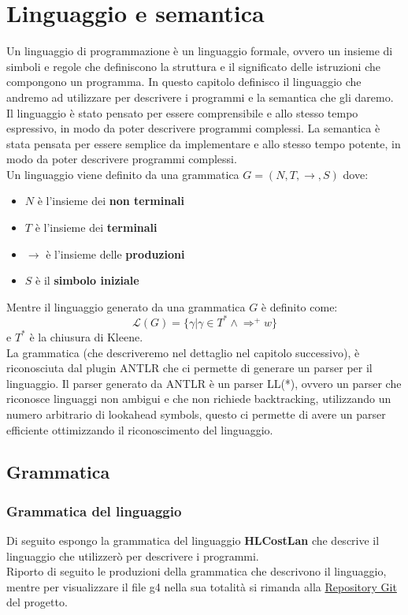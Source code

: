 \documentclass[../../main.tex]{subfiles}
\begin{document}
\chapter{Linguaggio e semantica}
Un linguaggio di programmazione è un linguaggio formale, ovvero un insieme di simboli e regole che definiscono la struttura e il significato delle istruzioni che compongono un programma.
In questo capitolo definisco il linguaggio che andremo ad utilizzare per descrivere i programmi e la semantica che gli daremo. Il linguaggio è stato pensato per essere comprensibile e allo stesso tempo espressivo, in modo da poter descrivere programmi complessi. La semantica è stata pensata per essere semplice da implementare e allo stesso tempo potente, in modo da poter descrivere programmi complessi.\\
Un linguaggio viene definito da una grammatica $G = (N, T ,\rightarrow, S)$ dove:
\begin{itemize}
    \item $N$ è l'insieme dei \textbf{non terminali}
    \item $T$ è l'insieme dei \textbf{terminali}
    \item $\rightarrow$ è l'insieme delle \textbf{produzioni}
    \item $S$ è il \textbf{simbolo iniziale}
\end{itemize}

Mentre il linguaggio generato da una grammatica $G$ è definito come:
\begin{equation}
    \mathcal{L}(G) = \{\gamma | \gamma \in T^* \land \Rightarrow^+ w\}
\end{equation}
e $T^*$ è la chiusura di Kleene.\\
La grammatica (che descriveremo nel dettaglio nel capitolo successivo), è riconosciuta dal plugin ANTLR che ci permette di generare un parser per il linguaggio. Il parser generato da ANTLR è un parser LL(*), ovvero un parser che riconosce linguaggi non ambigui e che non richiede backtracking, utilizzando un numero arbitrario di lookahead symbols, questo ci permette di avere un parser efficiente ottimizzando il riconoscimento del linguaggio.

\section{Grammatica}

\subsection{Grammatica del linguaggio}
Di seguito espongo la grammatica del linguaggio \textbf{HLCostLan} che descrive il linguaggio che utilizzerò per descrivere i programmi.\\
Riporto di seguito le produzioni della grammatica che descrivono il linguaggio, mentre per visualizzare il file g4 nella sua totalità si rimanda alla \href{https://github.com/minosse99/CostCompiler/blob/master/src/HLCostLan.g4}{Repository Git} del progetto.\\
\label{sec:grammatica}
\end{document}
